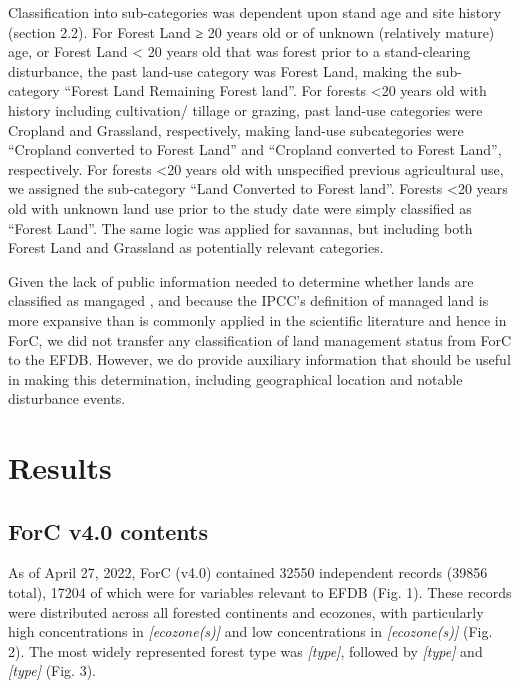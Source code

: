 \documentclass[, manuscript]{copernicus}
\begin{document}
Classification into sub-categories was dependent upon stand age and site
history (section 2.2). For Forest Land ≥ 20 years old or of unknown
(relatively mature) age, or Forest Land \textless{} 20 years old that
was forest prior to a stand-clearing disturbance, the past land-use
category was Forest Land, making the sub-category ``Forest Land
Remaining Forest land''. For forests \textless20 years old with history
including cultivation/ tillage or grazing, past land-use categories were
Cropland and Grassland, respectively, making land-use subcategories were
``Cropland converted to Forest Land'' and ``Cropland converted to Forest
Land'', respectively. For forests \textless20 years old with unspecified
previous agricultural use, we assigned the sub-category ``Land Converted
to Forest land''. Forests \textless20 years old with unknown land use
prior to the study date were simply classified as ``Forest Land''. The
same logic was applied for savannas, but including both Forest Land and
Grassland as potentially relevant categories.

Given the lack of public information needed to determine whether lands
are classified as mangaged
\citep{ogle_delineating_2018, deng_comparing_2021}, and because the
IPCC's definition of managed land is more expansive than is commonly
applied in the scientific literature and hence in ForC, we did not
transfer any classification of land management status from ForC to the
EFDB. However, we do provide auxiliary information that should be useful
in making this determination, including geographical location and
notable disturbance events.

\section{Results}

\subsection{ForC v4.0 contents}

As of April 27, 2022, ForC (v4.0) contained 32550 independent records
(39856 total), 17204 of which were for variables relevant to EFDB (Fig.
1). These records were distributed across all forested continents and
ecozones, with particularly high concentrations in
\emph{{[}ecozone(s){]}} and low concentrations in
\emph{{[}ecozone(s){]}} (Fig. 2). The most widely represented forest
type was \emph{{[}type{]}}, followed by \emph{{[}type{]}} and
\emph{{[}type{]}} (Fig. 3).
\end{document}
